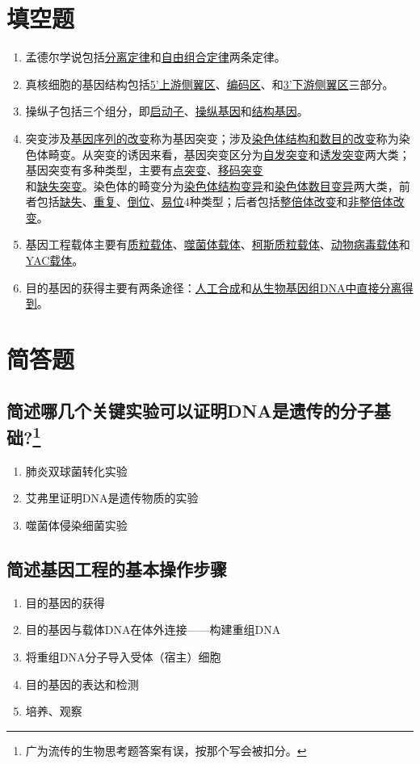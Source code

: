 \documentclass[UTF8]{article}
\begin{document}
    \section{填空题}
    \begin{enumerate}
        \item 孟德尔学说包括\underline{分离定律}和\underline{自由组合定律}两条定律。
        \item 真核细胞的基因结构包括\underline{5'上游侧翼区}、\underline{编码区}、和\underline{3'下游侧翼区}三部分。
        \item 操纵子包括三个组分，即\underline{启动子}、\underline{操纵基因}和\underline{结构基因}。
        \item 突变涉及\underline{基因序列的改变}称为基因突变；涉及\underline{染色体结构和数目的改变}称为染色体畸变。从突变的诱因来看，基因突变区分为\underline{自发突变}和\underline{诱发突变}两大类；基因突变有多种类型，主要有\underline{点突变}、\underline{移码突变} \\ 和\underline{缺失突变}。染色体的畸变分为\underline{染色体结构变异}和\underline{染色体数目变异}两大类，前者包括\underline{缺失}、\underline{重复}、\underline{倒位}、\underline{易位}4种类型；后者包括\underline{整倍体改变}和\underline{非整倍体改变}。
        \item 基因工程载体主要有\underline{质粒载体}、\underline{噬菌体载体}、\underline{柯斯质粒载体}、\underline{动物病毒载体}和\underline{YAC载体}。
        \item 目的基因的获得主要有两条途径：\underline{人工合成}和\underline{从生物基因组DNA中直接分离得到}。
    \end{enumerate}
    \section{简答题}
    \subsection{简述哪几个关键实验可以证明DNA是遗传的分子基础?\protect\footnote{广为流传的生物思考题答案有误，按那个写会被扣分。}}
    \begin{enumerate}
        \item 肺炎双球菌转化实验
        \item 艾弗里证明DNA是遗传物质的实验
        \item 噬菌体侵染细菌实验
    \end{enumerate}
    \subsection{简述基因工程的基本操作步骤}\begin{enumerate}
        \item 目的基因的获得
        \item 目的基因与载体DNA在体外连接——构建重组DNA
        \item 将重组DNA分子导入受体（宿主）细胞
        \item 目的基因的表达和检测
        \item 培养、观察
    \end{enumerate}
\end{document}
